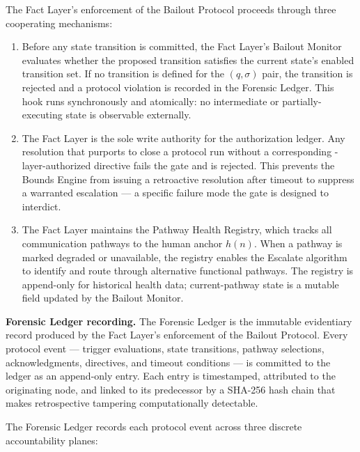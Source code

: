 The Fact Layer's enforcement of the Bailout Protocol proceeds through three cooperating mechanisms:

\begin{enumerate}\itemsep=0pt
\item[\emph{Pre-commit hook.}] Before any state transition is committed, the Fact Layer's Bailout Monitor evaluates whether the proposed transition satisfies the current state's enabled transition set. If no transition is defined for the $(q, \sigma)$ pair, the transition is rejected and a protocol violation is recorded in the Forensic Ledger. This hook runs synchronously and atomically: no intermediate or partially-executing state is observable externally.

\item[\emph{Authorization ledger gate.}] The Fact Layer is the sole write authority for the authorization ledger. Any resolution that purports to close a protocol run without a corresponding \purpose-layer-authorized directive fails the gate and is rejected. This prevents the Bounds Engine from issuing a retroactive resolution after timeout to suppress a warranted escalation --- a specific failure mode the gate is designed to interdict.

\item[\emph{Pathway Registry.}] The Fact Layer maintains the Pathway Health Registry, which tracks all communication pathways to the human anchor $h(n)$. When a pathway is marked degraded or unavailable, the registry enables the Escalate algorithm to identify and route through alternative functional pathways. The registry is append-only for historical health data; current-pathway state is a mutable field updated by the Bailout Monitor.
\end{enumerate}

\medskip
\noindent\textbf{Forensic Ledger recording.} The Forensic Ledger is the immutable evidentiary record produced by the Fact Layer's enforcement of the Bailout Protocol. Every protocol event --- trigger evaluations, state transitions, pathway selections, acknowledgments, directives, and timeout conditions --- is committed to the ledger as an append-only entry. Each entry is timestamped, attributed to the originating node, and linked to its predecessor by a SHA-256 hash chain that makes retrospective tampering computationally detectable.

The Forensic Ledger records each protocol event across three discrete accountability planes:

